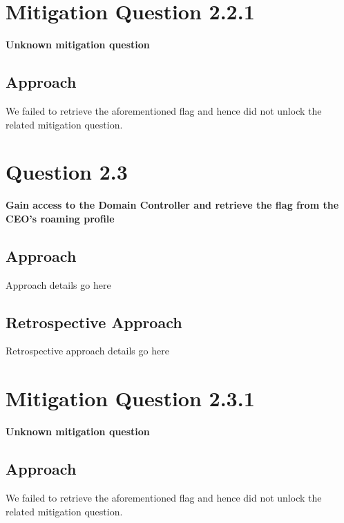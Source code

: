 \section{Mitigation Question 2.2.1}
\textbf{Unknown mitigation question}
\subsection{Approach}
We failed to retrieve the aforementioned flag and hence did not unlock the
related mitigation question.

\section{Question 2.3}
\textbf{Gain access to the Domain Controller and retrieve the flag from the
CEO's roaming profile}
\subsection{Approach}
Approach details go here
\subsection{Retrospective Approach}
Retrospective approach details go here

\section{Mitigation Question 2.3.1}
\textbf{Unknown mitigation question}
\subsection{Approach}
We failed to retrieve the aforementioned flag and hence did not unlock the
related mitigation question.
